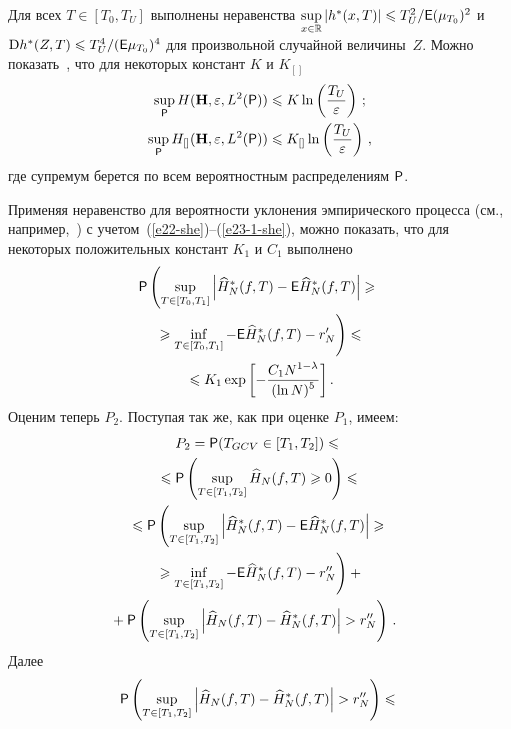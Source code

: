 \begin{multicols}{2}
Для всех $T\in[T_0,T_U]$ выполнены неравенства $\sup\limits_{x\in\mathbb{R}}\abs{h^*(x,T)}\hm\leqslant T^2_U/{\sf E}(\mu_{T_0})^2$ 
и $\mbox{D}h^*(Z,T)\hm\leqslant T^4_U/({\sf E}\mu_{T_0})^4$ для произвольной случайной величины~$Z$. 
Можно показать~\cite{22-she}, что для некоторых констант $K$ и $K_{[]}$
\begin{align}
\sup\limits_{\sf P}H(\mathbf{H},\varepsilon,L^2({\sf P}))&\leqslant K\ln\left(\displaystyle\frac{\displaystyle T_{U}\mathstrut}{\displaystyle \varepsilon\mathstrut}\right)\,;\label{e23-she}
\\
\sup\limits_{\sf P}H_{[]}(\mathbf{H},\varepsilon,L^2({\sf P}))&\leqslant K_{[]}\ln\left(\displaystyle\frac{\displaystyle T_{U}\mathstrut}{\displaystyle \varepsilon\mathstrut}\right)\,,\label{e23-1-she}
\end{align}
где супремум берется по всем вероятностным распределениям ${\sf P}$.

Применяя неравенство для вероятности уклонения эмпирического процесса (см., например,~\cite{18-she, 21-she, 23-she}) с 
учетом~(\ref{e22-she})--(\ref{e23-1-she}), можно показать, что для некоторых положительных констант $K_1$ и $C_1$ выполнено
\begin{multline}
{\sf P}\left(\sup\limits_{T\in[T_0,T_1]}\abs{\widehat{H}^{*}_N(f,T)-
{\sf E}\widehat{H}^{*}_N(f,T)}\geqslant{}\right.\\
\left.{}\geqslant\inf\limits_{T\in[T_0,T_1]}-{\sf E}\widehat{H}^{*}_N(f,T)-r'_N
\vphantom{\sup\limits_{T\in[T_0,T_1]}}\right)\leqslant{}\\
{}\leqslant K_1\exp\left[-\fr{C_1 N^{1-\lambda}}{(\ln N)^{5}}\right].\label{e24-she}
\end{multline}
Оценим теперь $P_2$. Поступая так же, как при оценке $P_1$, имеем:
\begin{multline}
P_2={\sf P}(T_{GCV}\in[T_1,T_2])\leqslant{}\\
{}\leqslant {\sf P}\left(\sup\limits_{T\in[T_1,T_2]}\widehat{H}_N(f,T)\geqslant 0\right)\leqslant{}\\
{}\leqslant{\sf P}\left(\sup\limits_{T\in[T_1,T_2]}\abs{\widehat{H}^{*}_N(f,T)-
{\sf E}\widehat{H}^{*}_N(f,T)}\geqslant{}\right.\\
\left.{}\geqslant\inf\limits_{T\in[T_1,T_2]}-{\sf E}\widehat{H}^{*}_N(f,T)-r''_N
\vphantom{\sup\limits_{T\in[T_0,T_1]}}\right)+{}\\
\hspace*{-3mm}{}+{\sf P}\left(\sup\limits_{T\in[T_1,T_2]} \abs{\widehat{H}_N(f,T)-\widehat{H}^{*}_N(f,T)}>r''_N\right)\,. \label{e25-she}
\end{multline}
Далее
\begin{multline}
{\sf P}\left(\sup\limits_{T\in[T_1,T_2]} \abs{\widehat{H}_N(f,T)-\widehat{H}^{*}_N(f,T)}>r''_N\right)\leqslant{}\\

\end{multline}
\end{multicols}

